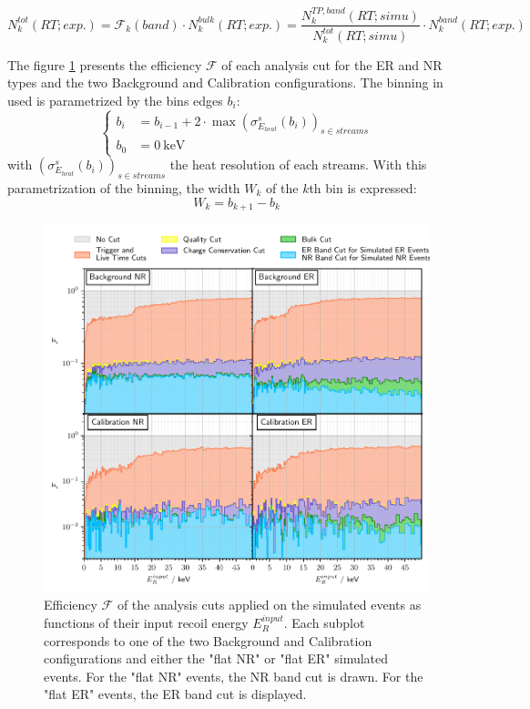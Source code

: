\begin{equation}
\label{eq:efficiency-correction}
N_k^{tot} (RT; exp.)
=
\mathcal{F}_k (band) \cdot N_k^{bulk} (RT; exp.)
=
\frac{ N_k^{TP, band} (RT; simu)}{ N_k^{tot} (RT; simu)} \cdot N_k^{band} (RT; exp.)
\end{equation}

The figure \ref{fig:cut-efficiency} presents the efficiency $\mathcal{F}$ of each analysis cut for the ER and NR types and the two Background and Calibration configurations. The binning in used is parametrized by the bins edges $b_i$:
\begin{equation}
\label{eq:bins-edges}
\begin{cases}
b_i &= b_{i-1} + 2 \cdot \max \left(\sigma_{E_{heat}}^s(b_i) \right)_{s \in streams}
\\
b_0 &= \SI{0}{\kilo\eV}
\end{cases}
\end{equation}
with $\left(\sigma_{E_{heat}}^s(b_i) \right)_{s \in streams}$ the heat resolution of each streams. With this parametrization of the binning, the width $W_k$ of the $k$th bin is expressed:
\begin{equation}
W_k = b_{k+1} - b_{k}
\end{equation}

\begin{figure}
\centering
\includegraphics[width=\linewidth,]{Figures/Neutron/cut_efficiency.pdf}
\caption{Efficiency $\mathcal{F}$ of the analysis cuts applied on the simulated events as functions of their input recoil energy $E_R^{input}$. Each subplot corresponds to one of the two Background and Calibration configurations and either the "flat NR" or "flat ER" simulated events. For the "flat NR" events, the NR band cut is drawn. For the "flat ER" events, the ER band cut is displayed.}
\label{fig:cut-efficiency}
\end{figure}

